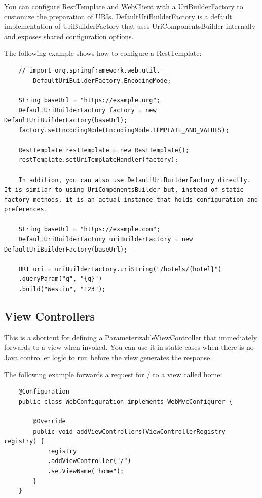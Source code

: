 \documentclass{scrartcl}
\begin{document}
You can configure RestTemplate and WebClient with a UriBuilderFactory to customize the preparation of URIs. DefaultUriBuilderFactory is a default implementation of UriBuilderFactory that uses UriComponentsBuilder internally and exposes shared configuration options.

The following example shows how to configure a RestTemplate:
\begin{lstlisting}
    // import org.springframework.web.util.
        DefaultUriBuilderFactory.EncodingMode;

    String baseUrl = "https://example.org";
    DefaultUriBuilderFactory factory = new DefaultUriBuilderFactory(baseUrl);
    factory.setEncodingMode(EncodingMode.TEMPLATE_AND_VALUES);

    RestTemplate restTemplate = new RestTemplate();
    restTemplate.setUriTemplateHandler(factory);

    In addition, you can also use DefaultUriBuilderFactory directly. It is similar to using UriComponentsBuilder but, instead of static factory methods, it is an actual instance that holds configuration and preferences.

    String baseUrl = "https://example.com";
    DefaultUriBuilderFactory uriBuilderFactory = new DefaultUriBuilderFactory(baseUrl);

    URI uri = uriBuilderFactory.uriString("/hotels/{hotel}")
    .queryParam("q", "{q}")
    .build("Westin", "123");
\end{lstlisting}

\subsection{View Controllers}

This is a shortcut for defining a ParameterizableViewController that immediately forwards to a view when invoked. You can use it in static cases when there is no Java controller logic to run before the view generates the response.

The following example forwards a request for / to a view called home:

\begin{lstlisting}
    @Configuration
    public class WebConfiguration implements WebMvcConfigurer {

        @Override
        public void addViewControllers(ViewControllerRegistry registry) {
            registry
            .addViewController("/")
            .setViewName("home");
        }
    }
\end{lstlisting}
\end{document}
